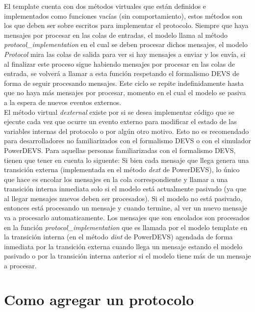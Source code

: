 \documentclass[10pt,a4paper]{article}
\begin{document}
El template cuenta con dos métodos virtuales que están definidos e implementados como funciones vacías (sin comportamiento), estos métodos son los que deben ser sobre escritos para implementar el protocolo. Siempre que haya mensajes por procesar en las colas de entradas, el modelo llama al método \textit{protocol\_implementation} en el cual se deben procesar dichos mensajes, el modelo \textit{Protocol} mira las colas de salida para ver si hay mensajes a enviar y los envía, si al finalizar este proceso sigue habiendo mensajes por procesar en las colas de entrada, se volverá a llamar a esta función respetando el formalismo DEVS de forma de seguir procesando mensajes. Este ciclo se repite indefinidamente hasta que no haya más mensajes por procesar, momento en el cual el modelo se pasiva a la espera de nuevos eventos externos. \\

El método virtual \textit{dexternal} existe por si se desea implementar código que se ejecute cada vez que ocurre un evento externo para modificar el estado de las variables internas del protocolo o por algún otro motivo. Esto no es recomendado para desarrolladores no familiarizados con el formalismo DEVS o con el simulador PowerDEVS. Para aquellas personas familiarizadas con el formalismo DEVS, tienen que tener en cuenta lo siguente: Si bien cada mensaje que llega genera una transición externa (implementada en el método \textit{dext} de PowerDEVS), lo único que hace es encolar los mensajes en la cola correspondiente y llamar a una transición interna inmediata solo si el modelo está actualmente pasivado (ya que al llegar mensajes nuevos deben ser procesados). Si el modelo no está pasivado, entonces está procesando un mensaje y cuando termine, al ver un nuevo mensaje va a procesarlo automaticamente. Los mensajes que son encolados son procesados en la función \textit{protocol\_implementation} que es llamada por el modelo template en la transición interna (en el método \textit{dint} de PowerDEVS) agendada de forma inmediata por la transición externa cuando llega un mensaje estando el modelo pasivado o por la transición interna anterior si el modelo tiene más de un mensaje a procesar. \\

\section{Como agregar un protocolo}
\end{document}
